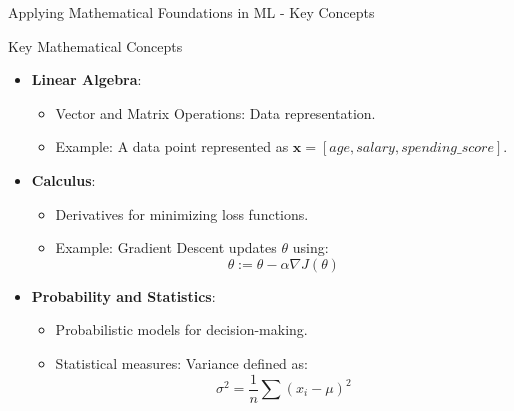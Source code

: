 \documentclass[aspectratio=169]{beamer}
\begin{document}
\begin{frame}[fragile]{Applying Mathematical Foundations in ML - Key Concepts}
    \begin{block}{Key Mathematical Concepts}
        \begin{itemize}
            \item \textbf{Linear Algebra}:
              \begin{itemize}
                  \item Vector and Matrix Operations: Data representation.
                  \item Example: A data point represented as \( \mathbf{x} = [age, salary, spending\_score] \).
              \end{itemize}
            \item \textbf{Calculus}:
              \begin{itemize}
                  \item Derivatives for minimizing loss functions.
                  \item Example: Gradient Descent updates \( \theta \) using:
                  \begin{equation}
                      \theta := \theta - \alpha \nabla J(\theta)
                  \end{equation}
              \end{itemize}
            \item \textbf{Probability and Statistics}:
              \begin{itemize}
                  \item Probabilistic models for decision-making.
                  \item Statistical measures: Variance defined as:
                  \begin{equation}
                      \sigma^2 = \frac{1}{n} \sum (x_i - \mu)^2
                  \end{equation}
              \end{itemize}
        \end{itemize}
    \end{block}
\end{frame}
\end{document}
